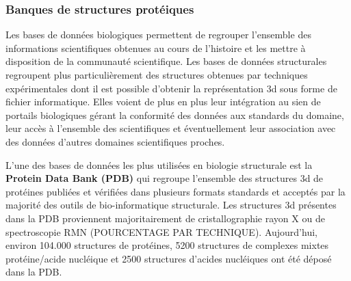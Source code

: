 \subsubsection{Banques de structures protéiques}

Les bases de données biologiques permettent de regrouper l'ensemble des informations scientifiques obtenues au cours de l'histoire et les mettre à disposition de la communauté scientifique. Les bases de données structurales regroupent plus particulièrement des structures obtenues par techniques expérimentales dont il est possible d'obtenir la représentation 3d sous forme de fichier informatique. 
Elles voient de plus en plus leur intégration au sien de portails biologiques gérant la conformité des données aux standards du domaine, leur accès à l'ensemble des scientifiques et éventuellement leur association avec des données d'autres domaines scientifiques proches.

L'une des bases de données les plus utilisées en biologie structurale est la \textbf{Protein Data Bank (PDB)} \cite{berman_protein_2000} qui regroupe l'ensemble des structures 3d de protéines publiées et vérifiées dans plusieurs formats standards et acceptés par la majorité des outils de bio-informatique structurale. Les structures 3d présentes dans la PDB proviennent majoritairement de cristallographie rayon X ou de spectroscopie RMN (POURCENTAGE PAR TECHNIQUE). Aujourd'hui, environ 104.000 structures de protéines, 5200 structures de complexes mixtes protéine/acide nucléique et 2500 structures d'acides nucléiques ont été déposé dans la PDB.

